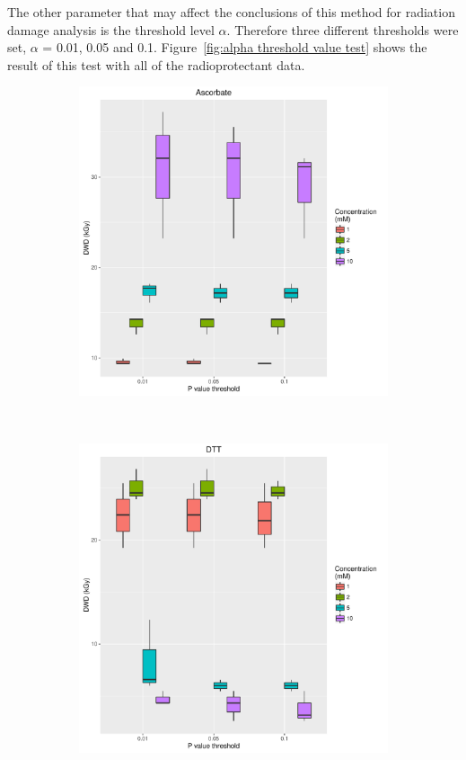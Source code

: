 The other parameter that may affect the conclusions of this method for radiation damage analysis is the threshold level $\alpha$. Therefore three different thresholds were set, $\alpha$ = 0.01, 0.05 and 0.1.
Figure~\ref{fig:alpha threshold value test} shows the result of this test with all of the radioprotectant data.
\begin{figure}
    \centering
    \begin{subfigure}[b]{0.75\textwidth}
            \centering
            \includegraphics[width=\textwidth]{figures/saxs/Ascorbate_PThresh_comp.pdf}
            \caption{}
            \label{}
    \end{subfigure}
    \\
    \begin{subfigure}[b]{0.75\textwidth}
            \centering
            \includegraphics[width=\textwidth]{figures/saxs/DTT_PThresh_comp.pdf}

\end{subfigure}
\end{figure}
